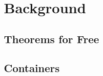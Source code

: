 
\section{Background}




\subsection{Theorems for Free}\label{sec:free}


\subsection{Containers}


\iffalse
- Deforestation (shortcut fusion)
- variations thereof
- cat-theory initial \& terminal
- library writer's guide
- church encodings
- free theorems
- further optimizations.
\fi


